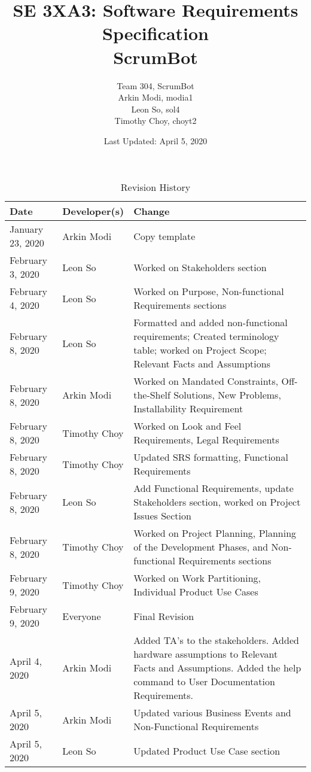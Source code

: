 \documentclass[12pt, titlepage]{article}
\title{SE 3XA3: Software Requirements Specification\\ScrumBot}
\author{
    Team 304, ScrumBot
        \\ Arkin Modi, modia1
        \\ Leon So, sol4
        \\ Timothy Choy, choyt2
}
\date{Last Updated: April 5, 2020}
\begin{document}
\maketitle

\tableofcontents
\listoftables
\listoffigures

\newpage

\begin{table}[!hbp]
    \caption{Revision History} \label{TblRevisionHistory}
    \begin{tabularx}{\textwidth}{llX}
        \toprule
            \textbf{Date} & \textbf{Developer(s)} & \textbf{Change}\\
        \midrule
            January 23, 2020 & Arkin Modi & Copy template\\
            February 3, 2020 & Leon So & Worked on Stakeholders section\\
            February 4, 2020 & Leon So & Worked on Purpose, Non-functional Requirements sections\\
            February 8, 2020 & Leon So & Formatted and added non-functional requirements; Created terminology table; worked on Project Scope; Relevant Facts and Assumptions\\
            February 8, 2020 & Arkin Modi & Worked on Mandated Constraints, Off-the-Shelf Solutions, New Problems, Installability Requirement\\
            February 8, 2020 & Timothy Choy & Worked on Look and Feel Requirements, Legal Requirements\\
            February 8, 2020 & Timothy Choy & Updated SRS formatting, Functional Requirements\\
            February 8, 2020 & Leon So & Add Functional Requirements, update Stakeholders section, worked on Project Issues Section\\
            February 8, 2020 & Timothy Choy & Worked on Project Planning, Planning of the Development Phases, and Non-functional Requirements sections\\
            February 9, 2020 & Timothy Choy & Worked on Work Partitioning, Individual Product Use Cases\\
            February 9, 2020 & Everyone & Final Revision\\
            April 4, 2020 & Arkin Modi & Added TA's to the stakeholders. Added hardware assumptions to Relevant Facts and Assumptions. Added the help command to User Documentation Requirements.\\
            April 5, 2020 & Arkin Modi & Updated various Business Events and Non-Functional Requirements\\
            April 5, 2020 & Leon So & Updated Product Use Case section\\
        \bottomrule
    \end{tabularx}
\end{table}
\end{document}
